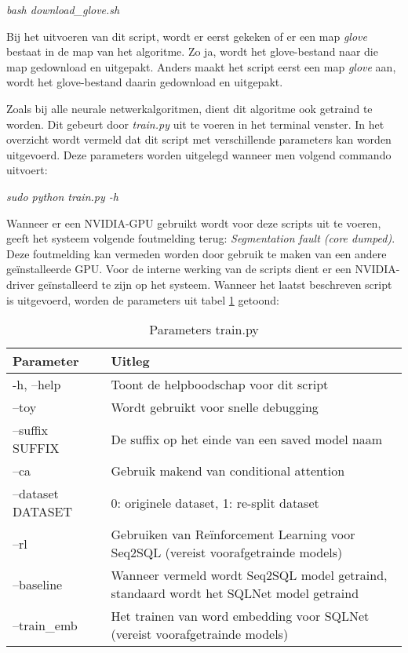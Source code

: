 \begin{center}
	\textit{bash download\_glove.sh}
\end{center}

Bij het uitvoeren van dit script, wordt er eerst gekeken of er een map \textit{glove} bestaat in de map van het algoritme. Zo ja, wordt het glove-bestand naar die map gedownload en uitgepakt. Anders maakt het script eerst een map \textit{glove} aan, wordt het glove-bestand daarin gedownload en uitgepakt. 

Zoals bij alle neurale netwerkalgoritmen, dient dit algoritme ook getraind te worden. Dit gebeurt door \textit{train.py} uit te voeren in het terminal venster. In het overzicht wordt vermeld dat dit script met verschillende parameters kan worden uitgevoerd. Deze parameters worden uitgelegd wanneer men volgend commando uitvoert:

\begin{center}
	\textit{sudo python train.py -h}
\end{center}

Wanneer er een NVIDIA-GPU gebruikt wordt voor deze scripts uit te voeren, geeft het systeem volgende foutmelding terug: \textit{Segmentation fault (core dumped)}. Deze foutmelding kan vermeden worden door gebruik te maken van een andere geïnstalleerde GPU. Voor de interne werking van de scripts dient er een NVIDIA-driver geïnstalleerd te zijn op het systeem. Wanneer het laatst beschreven script is uitgevoerd, worden de parameters uit tabel \ref{table:paramtrain} getoond:

\begin{table}[htb]
	\centering
	\begin{tabular}{ | l | p{5cm} |}
		\hline
		Parameter 			& Uitleg \\ \hline
		-h, --help 			& Toont de helpboodschap voor dit script \\ \hline
		--toy 				& Wordt gebruikt voor snelle debugging \\ \hline
		--suffix SUFFIX		& De suffix op het einde van een saved model naam \\ \hline
		--ca				& Gebruik makend van conditional attention \\ \hline
		--dataset DATASET 	& 0: originele dataset, 1: re-split dataset \\ \hline
		--rl				& Gebruiken van Reïnforcement Learning voor Seq2SQL (vereist voorafgetrainde models) \\ \hline
		--baseline			& Wanneer vermeld wordt Seq2SQL model getraind, standaard wordt het SQLNet model getraind \\ \hline
		--train\_emb		& Het trainen van word embedding voor SQLNet (vereist voorafgetrainde models) \\ \hline	 
	\end{tabular}
	\caption{Parameters train.py}
	\label{table:paramtrain}
\end{table}

